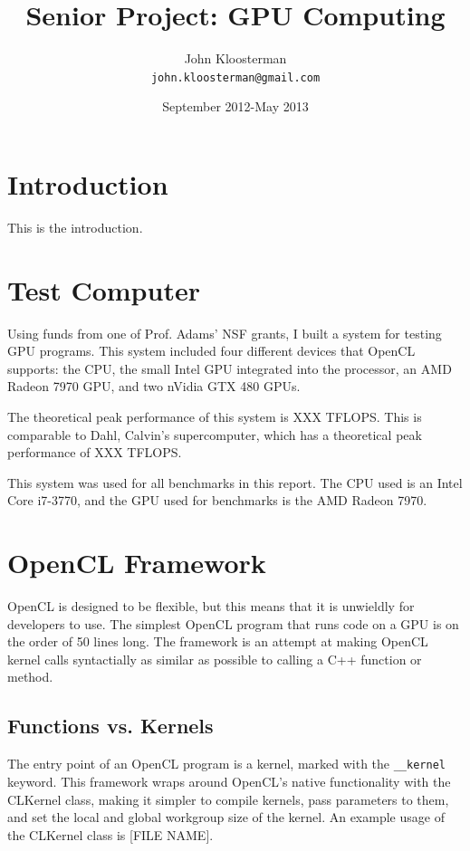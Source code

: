 \documentclass{article}
\begin{document}
\lstset{ 
  language=C++,
  belowcaptionskip=1\baselineskip,
  xleftmargin=\parindent,
  basicstyle=\footnotesize\ttfamily
 }

\title{Senior Project: GPU Computing}
\author{John Kloosterman \\
  \texttt{john.kloosterman@gmail.com}}
\date{September 2012-May 2013}
\maketitle

\section{Introduction}
This is the introduction.

\tableofcontents

\section{Test Computer}
Using funds from one of Prof. Adams' NSF grants, I built a system for testing GPU programs. This system included four different devices that OpenCL supports: the CPU, the small Intel GPU integrated into the processor, an AMD Radeon 7970 GPU, and two nVidia GTX 480 GPUs.

The theoretical peak performance of this system is XXX TFLOPS. This is comparable to Dahl, Calvin's supercomputer, which has a theoretical peak performance of XXX TFLOPS. 

This system was used for all benchmarks in this report. The CPU used is an Intel Core i7-3770, and the GPU used for benchmarks is the AMD Radeon 7970.

\section{OpenCL Framework}
OpenCL is designed to be flexible, but this means that it is unwieldly for developers to use. The simplest OpenCL program that runs code on a GPU is on the order of 50 lines long. The framework is an attempt at making OpenCL kernel calls syntactially as similar as possible to calling a C++ function or method.

\subsection{Functions vs. Kernels}
The entry point of an OpenCL program is a kernel, marked with the \texttt{\_\_kernel} keyword. This framework wraps around OpenCL's native functionality with the CLKernel class, making it simpler to compile kernels, pass parameters to them, and set the local and global workgroup size of the kernel. An example usage of the CLKernel class is [FILE NAME].
\end{document}
